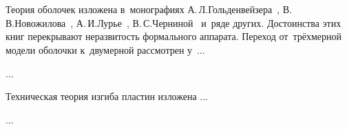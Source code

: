 \vspace{8mm}
\hfill\begin{minipage}[b]{0.95\linewidth}
\fontsize{10}{12}\selectfont

\section*{\wordforbibliography}

\begin{otherlanguage}{russian}

Теория оболочек изложена в~монографиях А.\,Л.\;Гольденвейзера~\cite{goldenveizer-thinshells}, В.\,В.\;Новожилова~\cite{novozhilov-theoryofthinshells}, А.\,И.\;Лурье~\cite{lurie-thinwalledshells}, В.\,С.\;Черниной~\cite{chernina-thinwalledshells} и~ряде других. Достоинства этих книг перекрывают неразвитость формального аппарата. Переход от~трёхмерной модели оболочки к~двумерной рассмотрен у~...

...

Техническая теория изгиба пластин изложена ...

...

\end{otherlanguage}

\end{minipage}
